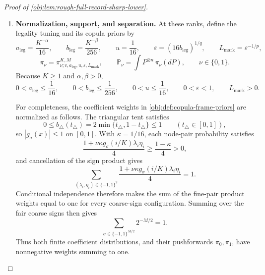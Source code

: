 \begin{proof}[Proof of \cref{obj:lem:rough-full-record-sharp-lower}]
\begin{enumerate}
The definition of the threshold gives
\[
n\ge32^{D_p\gamma/(2S)},
\qquad
K^{S/\gamma}\ge n^{2S/(D_p\gamma)}\ge32.
\]
Thus the coarse target \(K^{S/\gamma}/16\) is at least \(2\).
Applying the floor inequalities to its base-two logarithm gives
\[
\frac{K^{S/\gamma}}{32}\le M
\le\frac{K^{S/\gamma}}{16},
\qquad M\ge2.
\]
Both ranks are powers of two. Since \(K\ge1\) and \(S/\gamma<1\),
\[
16M\le K^{S/\gamma}\le K,
\qquad
M\le K^{S/\gamma}.
\]
These are all the required rank-legality conditions.

\item \textbf{Normalization, support, and separation.}
At these ranks, define the legality tuning and its copula priors by
\[
a_{\mathrm{leg}}=\frac{K^{-\alpha}}{16},
\qquad
b_{\mathrm{leg}}=\frac{K^{-\beta}}{256},
\qquad
u=\frac1{16},
\qquad
\varepsilon=(16b_{\mathrm{leg}})^{1/q},
\qquad
L_{\mathrm{mark}}=\varepsilon^{-1/p},
\]
\[
\pi_\nu=\pi^{K,M}_{\nu;v,a_{\mathrm{leg}},u,\varepsilon,L_{\mathrm{mark}}},
\qquad
\mathbb P_\nu=\int P^{\otimes n}\,\pi_\nu(dP),
\qquad \nu\in\{0,1\}.
\]
Because \(K\ge1\) and \(\alpha,\beta>0\),
\[
0<a_{\mathrm{leg}}\le\frac1{16},
\qquad
0<b_{\mathrm{leg}}\le\frac1{256},
\qquad
0<u\le\frac1{16},
\qquad
0<\varepsilon<1,
\qquad L_{\mathrm{mark}}>0.
\]

For completeness, the coefficient weights in
\cref{obj:def:copula-frame-priors} are normalized as follows.
The triangular tent satisfies
\[
0\le b_\triangle(t_{\triangle})=2\min\{t_{\triangle},1-t_{\triangle}\}\le1
\qquad(t_{\triangle}\in[0,1]),
\]
so \(|g_\sigma(x)|\le1\) on \([0,1]\). With \(\kappa=1/16\), each node-pair probability satisfies
\[
\frac{1+\nu\kappa g_\sigma(i/K)\lambda_i\eta_i}{4}
\ge\frac{1-\kappa}{4}>0,
\]
and cancellation of the sign product gives
\[
\sum_{(\lambda_i,\eta_i)\in\{-1,1\}^2}
\frac{1+\nu\kappa g_\sigma(i/K)\lambda_i\eta_i}{4}
=1.
\]
Conditional independence therefore makes the sum of the fine-pair product weights equal to one for every coarse-sign configuration. Summing over the fair coarse signs then gives
\[
\sum_{\sigma\in\{-1,1\}^{M/2}}2^{-M/2}=1.
\]
Thus both finite coefficient distributions, and their pushforwards \(\pi_0,\pi_1\), have nonnegative weights summing to one.


\end{enumerate}
\end{proof}
